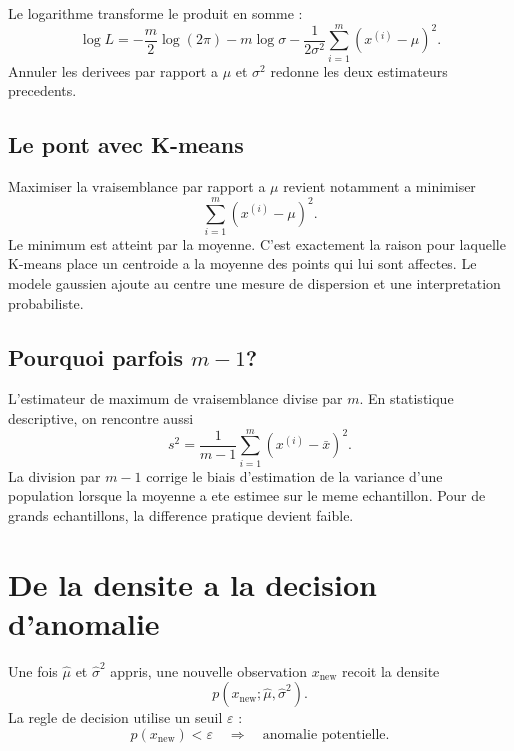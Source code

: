 Le logarithme transforme le produit en somme :
\begin{equation}
\log L=-\frac{m}{2}\log(2\pi)-m\log\sigma
-\frac{1}{2\sigma^2}\sum_{i=1}^{m}(x^{(i)}-\mu)^2.
\end{equation}
Annuler les derivees par rapport a $\mu$ et $\sigma^2$ redonne les deux
estimateurs precedents.

\subsection{Le pont avec K-means}

Maximiser la vraisemblance par rapport a $\mu$ revient notamment a minimiser
\begin{equation}
\sum_{i=1}^{m}(x^{(i)}-\mu)^2.
\end{equation}
Le minimum est atteint par la moyenne. C'est exactement la raison pour laquelle
K-means place un centroide a la moyenne des points qui lui sont affectes. Le
modele gaussien ajoute au centre une mesure de dispersion et une interpretation
probabiliste.

\subsection{Pourquoi parfois \texorpdfstring{$m-1$}{m-1}?}

L'estimateur de maximum de vraisemblance divise par $m$. En statistique
descriptive, on rencontre aussi
\begin{equation}
s^2=\frac{1}{m-1}\sum_{i=1}^{m}(x^{(i)}-\bar x)^2.
\end{equation}
La division par $m-1$ corrige le biais d'estimation de la variance d'une
population lorsque la moyenne a ete estimee sur le meme echantillon. Pour de
grands echantillons, la difference pratique devient faible.

\section{De la densite a la decision d'anomalie}

Une fois $\widehat\mu$ et $\widehat\sigma^2$ appris, une nouvelle observation
$x_{\mathrm{new}}$ recoit la densite
\begin{equation}
p(x_{\mathrm{new}};\widehat\mu,\widehat\sigma^2).
\end{equation}
La regle de decision utilise un seuil $\varepsilon$ :
\begin{equation}
p(x_{\mathrm{new}})<\varepsilon
\quad\Longrightarrow\quad
\text{anomalie potentielle}.
\end{equation}

